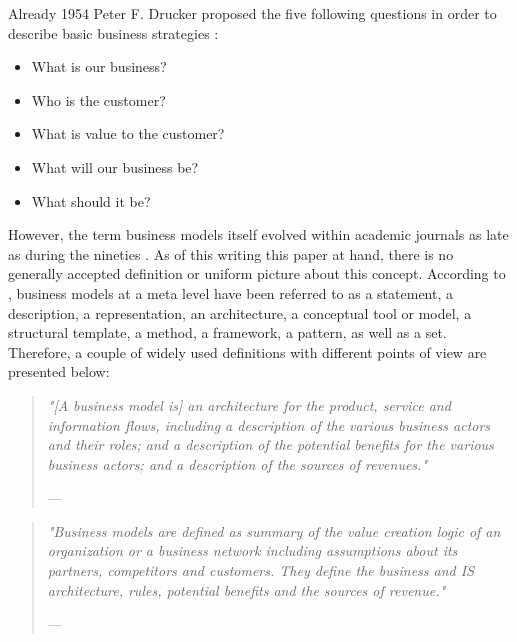 Already 1954 Peter F. Drucker proposed the five following questions in order to describe basic business strategies \citep[pp. 49-61]{Drucker1954}:

\begin{itemize}
\item What is our business?
\item Who is the customer?
\item What is value to the customer?
\item What will our business be?
\item What should it be?
\end{itemize}

However, the term business models itself evolved within academic journals as late as during the nineties . As of this writing this paper at hand, there is no generally accepted definition or uniform picture about this concept. According to \citet[p. 1022]{Zott2011}, business models at a meta level have been referred to as a statement, a description, a representation, an architecture, a conceptual tool or model, a structural template, a method, a framework, a pattern, as well as a set. Therefore, a couple of widely used definitions with different points of view are presented below:
	
\begin{quote}{\slshape 
"[A business model is] an architecture for the product, service and information flows, including a description of the various business actors and their roles; and a description of the potential benefits for the various business actors; and a description of the sources of revenues."}
\vspace*{-5pt}
\begin{flushright}
	--- \citet[p. 2]{Timmers1998}
\end{flushright}
\end{quote}

\begin{quote}{\slshape 
"Business models are defined as summary of the value creation logic of an organization or a business network including assumptions about its partners, competitors and customers. They define the business and IS architecture, rules, potential benefits and the sources of revenue."}
\vspace*{-5pt}
\begin{flushright}
	--- \citet[p. 798]{Klueber2000}
\end{flushright}
\end{quote}

